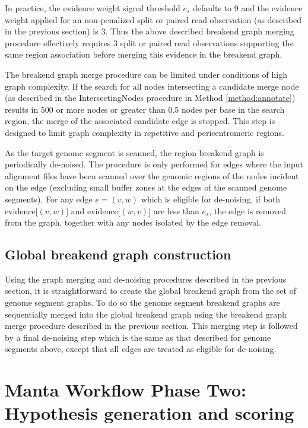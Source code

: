 \documentclass{article}
\begin{document}
In practice, the evidence weight signal threshold $e_s$ defaults to 9 and the evidence weight applied for an non-penalized split or paired read observation (as described in the previous section) is 3. Thus the above described breakend graph merging procedure effectively requires 3 split or paired read observations supporting the same region association before merging this evidence in the breakend graph.

The breakend graph merge procedure can be limited under conditions of high graph complexity. If the search for all nodes intersecting a candidate merge node (as described in the IntersectingNodes procedure in Method \ref{method:annotate}) results in 500 or more nodes or greater than 0.5 nodes per base in the search region, the merge of the associated candidate edge is stopped. This step is designed to limit graph complexity in repetitive and pericentromeric regions.

As the target genome segment is scanned, the region breakend graph is periodically de-noised. The procedure is only performed for edges where the input alignment files have been scanned over the genomic regions of the nodes incident on the edge (excluding small buffer zones at the edges of the scanned genome segments). For any edge $e = (v,w)$ which is eligible for de-noising, if both evidence[$(v,w)$] and evidence[$(w,v)$] are less than $e_s$, the edge is removed from the graph, together with any nodes isolated by the edge removal.

\subsection{Global breakend graph construction}

Using the graph merging and de-noising procedures described in the previous section, it is straightforward to create the global breakend graph from the set of genome segment graphs. To do so the genome segment breakend graphs are sequentially merged into the global breakend graph using the breakend graph merge procedure described in the previous section. This merging step is followed by a final de-noising step which is the same as that described for genome segments above, except that all edges are treated as eligible for de-noising.

\section{Manta Workflow Phase Two: Hypothesis generation and scoring}
\end{document}
